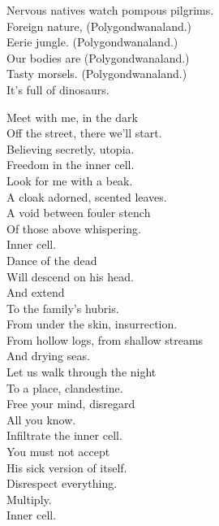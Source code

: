 Nervous natives watch pompous pilgrims. \\
Foreign nature, (Polygondwanaland.) \\
Eerie jungle. (Polygondwanaland.) \\
Our bodies are (Polygondwanaland.) \\
Tasty morsels. (Polygondwanaland.) \\

It's full of dinosaurs. \\





Meet with me, in the dark \\
Off the street, there we'll start. \\
Believing secretly, utopia. \\
Freedom in the inner cell. \\

Look for me with a beak. \\
A cloak adorned, scented leaves. \\
A void between fouler stench \\
Of those above whispering. \\
Inner cell. \\

Dance of the dead \\
Will descend on his head. \\
And extend \\
To the family's hubris. \\

From under the skin, insurrection. \\
From hollow logs, from shallow streams \\
And drying seas. \\

Let us walk through the night \\
To a place, clandestine. \\
Free your mind, disregard \\
All you know. \\
Infiltrate the inner cell. \\

You must not accept \\
His sick version of  itself. \\
Disrespect everything. \\
Multiply. \\
Inner cell. \\

